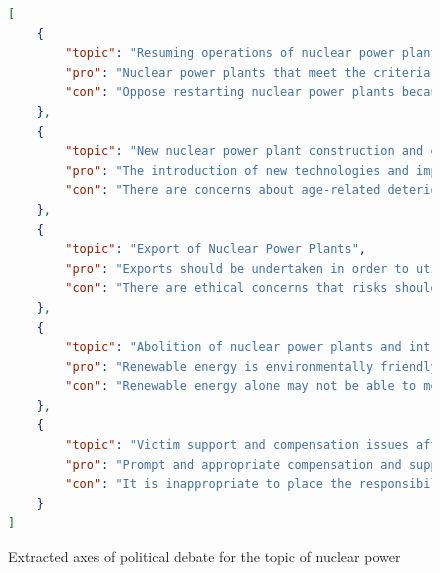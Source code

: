 \documentclass[final,5p,times,twocolumn,authoryear]{elsarticle}
\begin{document}
\begin{figure}[h]
\centering
      \begin{lstlisting}[language=json,firstnumber=1]
[
    {
        "topic": "Resuming operations of nuclear power plants",
        "pro": "Nuclear power plants that meet the criteria should be restarted to ensure a stable energy supply and lower electricity prices.Important for achieving carbon neutrality.",
        "con": "Oppose restarting nuclear power plants because of the lessons learned from the Fukushima Daiichi nuclear accident, unresolved safety issues, and inadequate evacuation plans.We call for a transition to renewable energy."
    },
    {
        "topic": "New nuclear power plant construction and extension of operating periods", 
        "pro": "The introduction of new technologies and improvement of safety could contribute to a stable energy supply, and therefore the extension of operating periods should also be considered.",
        "con": "There are concerns about age-related deterioration and increased risk. We should aim for zero nuclear power plants and do not approve new construction or extension of operating periods."
    },
    {
        "topic": "Export of Nuclear Power Plants", 
        "pro": "Exports should be undertaken in order to utilize Japanese nuclear technology in the international market and maintain economic competitiveness." ,
        "con": "There are ethical concerns that risks should not be spread to other countries while safety cannot be ensured even domestically."
    },
    {
        "topic": "Abolition of nuclear power plants and introduction of renewable energy", 
        "pro": "Renewable energy is environmentally friendly and provides a sustainable energy supply. We should shift to this to reduce the risks posed by nuclear power.",
        "con": "Renewable energy alone may not be able to meet short-term demand, and the use of nuclear power should also be considered."
    },
    {
        "topic": "Victim support and compensation issues after the Fukushima Daiichi Nuclear Power Plant accident", 
        "pro": "Prompt and appropriate compensation and support for victims is necessary. The government should continue to take responsibility for the situation." ,
        "con": "It is inappropriate to place the responsibility solely on local governments and individual companies, as the burden should be considered by the entire population who benefited from electricity consumption."
    }
]
\end{lstlisting}

\caption{Extracted axes of political debate for the topic of nuclear power}
\label{fig: extracted axes nuclear power}
\end{figure}
\end{document}
